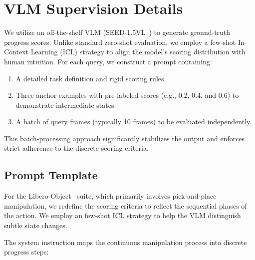 

\section{VLM Supervision Details}
\label{app:progress_grading}


We utilize an off-the-shelf VLM (SEED-1.5VL~\cite{guo2025seed1}) to generate ground-truth progress scores. Unlike standard zero-shot evaluation, we employ a few-shot In-Context Learning (ICL) strategy to align the model's scoring distribution with human intuition.
For each query, we construct a prompt containing:
\begin{enumerate}
    \item A detailed task definition and rigid scoring rules.
    \item Three anchor examples with pre-labeled scores (e.g., 0.2, 0.4, and 0.6) to demonstrate intermediate states.
    \item A batch of query frames (typically 10 frames) to be evaluated independently.
\end{enumerate}
This batch-processing approach significantly stabilizes the output and enforces strict adherence to the discrete scoring criteria.

\subsection{Prompt Template}
For the Libero-Object~\cite{liu2024libero} suite, which primarily involves pick-and-place manipulation, we redefine the scoring criteria to reflect the sequential phases of the action. We employ an few-shot ICL strategy to help the VLM distinguish subtle state changes.

The system instruction maps the continuous manipulation process into discrete progress steps:

